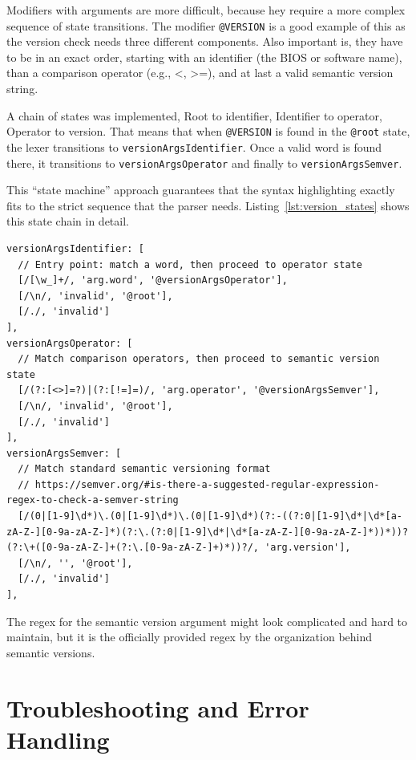 Modifiers with arguments are more difficult, because hey require a more complex sequence of state transitions. The modifier \texttt{@VERSION} is a good example of this as the version check needs three different components. Also important is,  they have to be in an exact order, starting with an identifier (the BIOS or software name), than a comparison operator (e.g., <, >=), and at last a valid semantic version string.

A chain of states was implemented, Root to identifier, Identifier to operator, Operator to version. That means that when \texttt{@VERSION} is found in the \texttt{@root} state, the lexer transitions to \texttt{versionArgsIdentifier}. Once a valid word is found there, it transitions to \texttt{versionArgsOperator} and finally to \texttt{versionArgsSemver}.

This ``state machine'' approach guarantees that the syntax highlighting exactly fits to the strict sequence that the parser needs. Listing~\ref{lst:version_states} shows this state chain in detail. 

\begin{lstlisting}[caption={State transitions for the \texttt{@VERSION} modifier}, label={lst:version_states}, 
  breaklines=true, breakatwhitespace=false, float=htbp ]
versionArgsIdentifier: [ 
  // Entry point: match a word, then proceed to operator state
  [/[\w_]+/, 'arg.word', '@versionArgsOperator'],
  [/\n/, 'invalid', '@root'],
  [/./, 'invalid']
],
versionArgsOperator: [
  // Match comparison operators, then proceed to semantic version state
  [/(?:[<>]=?)|(?:[!=]=)/, 'arg.operator', '@versionArgsSemver'],
  [/\n/, 'invalid', '@root'],
  [/./, 'invalid']
],
versionArgsSemver: [
  // Match standard semantic versioning format
  // https://semver.org/#is-there-a-suggested-regular-expression-regex-to-check-a-semver-string
  [/(0|[1-9]\d*)\.(0|[1-9]\d*)\.(0|[1-9]\d*)(?:-((?:0|[1-9]\d*|\d*[a-zA-Z-][0-9a-zA-Z-]*)(?:\.(?:0|[1-9]\d*|\d*[a-zA-Z-][0-9a-zA-Z-]*))*))?(?:\+([0-9a-zA-Z-]+(?:\.[0-9a-zA-Z-]+)*))?/, 'arg.version'],
  [/\n/, '', '@root'],
  [/./, 'invalid']
],
\end{lstlisting}

The \gls{regex} for the semantic version argument might look complicated and hard to maintain, but it is the officially provided \gls{regex} by the organization behind semantic versions. 

\section{Troubleshooting and Error Handling}

